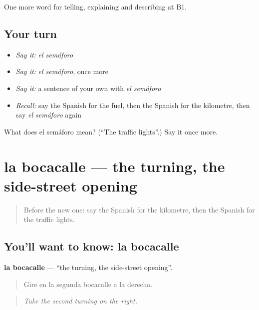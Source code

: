 \begin{grammarlens}[title={What you've built}]
One more word for telling, explaining and describing at B1.
\end{grammarlens}

\subsection*{Your turn}
\begin{itemize}
\raggedright
  \item \emph{Say it:} \emph{el semáforo}
  \item \emph{Say it:} \emph{el semáforo}, once more
  \item \emph{Say it:} a sentence of your own with \emph{el semáforo}
  \item \emph{Recall:} say the Spanish for the fuel, then the Spanish for the kilometre, then say \emph{el semáforo} again
\end{itemize}

\begin{tcolorbox}[breakable,colback=teal!4,colframe=teal!35!black,title={Before you move on}]
What does el semáforo mean? (\textquotedblleft{}The traffic lights\textquotedblright{}.) Say it once more.
\end{tcolorbox}
\section[la bocacalle]{la bocacalle — the turning, the side-street opening}

\label{lesson:ES-C647-bocacalle}



\begin{quote}
Before the new one: say the Spanish for the kilometre, then the Spanish for the traffic lights.
\end{quote}

\subsection*{You'll want to know: la bocacalle}
\textbf{la bocacalle} — \textquotedblleft{}the turning, the side-street opening\textquotedblright{}.

\begin{quote}
Gire en la segunda bocacalle a la derecha.
\end{quote}

\begin{quote}
\emph{Take the second turning on the right.}
\end{quote}

